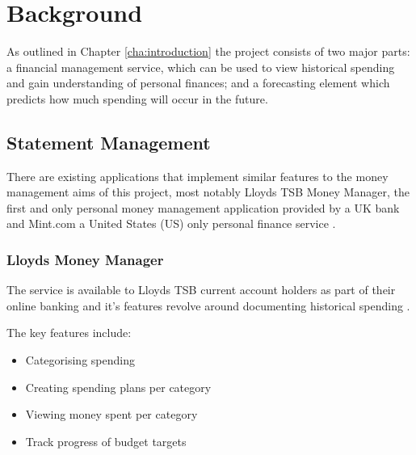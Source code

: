 \chapter{Background}
\label{cha:background}

\begin{comment}
Chapter 2: Background and literature survey
This chapter should give essential background information with references to published material in research papers, books, URLs, magazine articles and even newspapers. Expand on any references to other work that have been mentioned in Chapter 1. Refer to the notes on references (below) for the preferred way of referencing publications. The reader, stimulated by the presentation of ideas in this section, may be led to consult some or all of the referenced publications. This section will be useful for any student in a subsequent year who wishes to take the project further.
\end{comment}

As outlined in Chapter \ref{cha:introduction} the project consists of two major parts: a financial management service, which can be used to view historical spending and gain understanding of personal finances; and a forecasting element which predicts how much spending will occur in the future. 
 

\section{Statement Management}
There are existing applications that implement similar features to the money management aims of this project, most notably Lloyds TSB Money Manager, the first and only personal money management application provided by a UK bank and Mint.com a United States (US) only personal finance service \parencite{lloyds2014moneymanager, mint2014whatismint}.

\subsection{Lloyds Money Manager}
The service is available to Lloyds TSB current account holders as part of their online banking and it's features revolve around documenting historical spending \parencite{lloyds2014money}.

The key features include:
\begin{itemize}
\item Categorising spending
\item Creating spending plans per category
\item Viewing money spent per category
\item Track progress of budget targets
\end{itemize}

